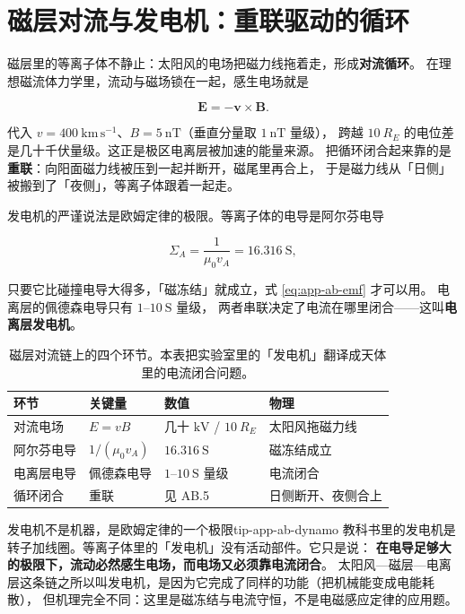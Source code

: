 \section{磁层对流与发电机：重联驱动的循环}
\label{sec:app-ab-convection}

磁层里的等离子体不静止：太阳风的电场把磁力线拖着走，形成\textbf{对流循环}。
在理想磁流体力学里，流动与磁场锁在一起，感生电场就是

\begin{equation}
\mathbf{E}=-\mathbf{v}\times\mathbf{B}.
\label{eq:app-ab-emf}
\end{equation}

代入 $v=400\ \mathrm{km\,s^{-1}}$、$B=5\ \mathrm{nT}$（垂直分量取 $1\ \mathrm{nT}$ 量级），
跨越 $10\ R_E$ 的电位差是几十千伏量级。这正是极区电离层被加速的能量来源。
把循环闭合起来靠的是\textbf{重联}：向阳面磁力线被压到一起并断开，磁尾里再合上，
于是磁力线从「日侧」被搬到了「夜侧」，等离子体跟着一起走。

发电机的严谨说法是欧姆定律的极限。等离子体的电导是阿尔芬电导

\begin{equation}
\Sigma_A=\frac{1}{\mu_0 v_A}=16.316\ \mathrm{S},
\label{eq:app-ab-sigma}
\end{equation}

只要它比碰撞电导大得多，「磁冻结」就成立，式 \eqref{eq:app-ab-emf} 才可以用。
电离层的佩德森电导只有 $1$--$10\ \mathrm{S}$ 量级，
两者串联决定了电流在哪里闭合——这叫\textbf{电离层发电机}。

\begin{table}[htbp]
\centering
\small
\caption{磁层对流链上的四个环节。本表把实验室里的「发电机」翻译成天体里的电流闭合问题。}
\label{tab:app-ab-convection}
\begin{tabular}{p{3.2cm}p{3.2cm}p{3.4cm}p{4.0cm}}
\toprule
环节 & 关键量 & 数值 & 物理 \\
\midrule
对流电场 & $E=vB$ & 几十 $\mathrm{kV}$ / $10\ R_E$ & 太阳风拖磁力线 \\
阿尔芬电导 & $1/(\mu_0v_A)$ & $16.316\ \mathrm{S}$ & 磁冻结成立 \\
电离层电导 & 佩德森电导 & $1$--$10\ \mathrm{S}$ 量级 & 电流闭合 \\
循环闭合 & 重联 & 见 AB.5 & 日侧断开、夜侧合上 \\
\bottomrule
\end{tabular}

\end{table}

\begin{tip}{发电机不是机器，是欧姆定律的一个极限}{tip-app-ab-dynamo}
教科书里的发电机是转子加线圈。等离子体里的「发电机」没有活动部件。它只是说：
\textbf{在电导足够大的极限下，流动必然感生电场，而电场又必须靠电流闭合}。
太阳风—磁层—电离层这条链之所以叫发电机，是因为它完成了同样的功能（把机械能变成电能耗散），
但机理完全不同：这里是磁冻结与电流守恒，不是电磁感应定律的应用题。
\end{tip}

